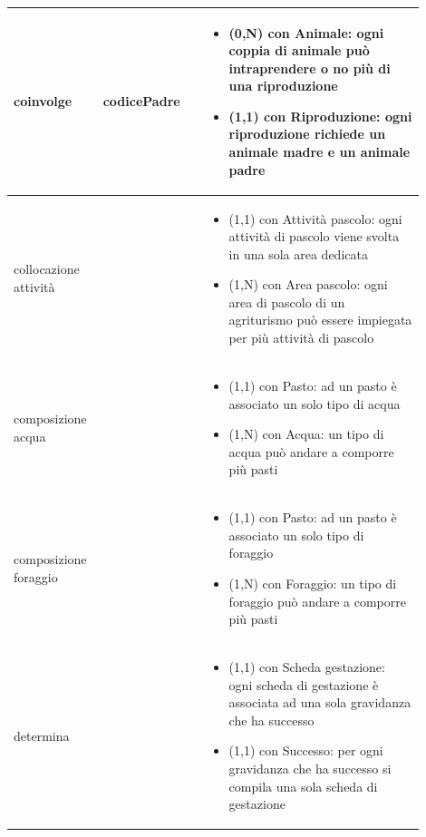 \documentclass[12pt,a4paper]{article}
\begin{document}
\begin{center}
\begin{longtable}{|p{0.16\linewidth}|p{0.24\linewidth}|p{0.50\linewidth}|}
\hline
coinvolge				&  codicePadre 
					& \begin{itemize}
						\setlength{\itemindent}{-1em}
						\vspace{-25pt}
						\setlength\itemsep{-0.25em}
						\item (0,N) con Animale: ogni coppia di animale può intraprendere o no più di una riproduzione
						\item (1,1) con Riproduzione: ogni riproduzione richiede un animale madre e un animale padre
					\end{itemize}\\ 

\hline
collocazione attività 				&   
					& \begin{itemize}
						\setlength{\itemindent}{-1em}
						\vspace{-25pt}
						\setlength\itemsep{-0.25em}
						\item (1,1) con Attività pascolo: ogni attività di pascolo viene svolta in una sola area dedicata
						\item (1,N) con Area pascolo: ogni area di pascolo di un agriturismo può essere impiegata per più attività di pascolo
					\end{itemize}\\ 

\hline
composizione acqua 				&   
					& \begin{itemize}
						\setlength{\itemindent}{-1em}
						\vspace{-25pt}
						\setlength\itemsep{-0.25em}
						\item (1,1) con Pasto: ad un pasto è associato un solo tipo di acqua
						\item (1,N) con Acqua: un tipo di acqua può andare a comporre più pasti
					\end{itemize}\\ 

\hline
composizione foraggio 				&   
					& \begin{itemize}
						\setlength{\itemindent}{-1em}
						\vspace{-25pt}
						\setlength\itemsep{-0.25em}
						\item (1,1) con Pasto: ad un pasto è associato un solo tipo di foraggio
						\item (1,N) con Foraggio: un tipo di foraggio può andare a comporre più pasti
					\end{itemize}\\ 

\hline
determina				&   
					& \begin{itemize}
						\setlength{\itemindent}{-1em}
						\vspace{-25pt}
						\setlength\itemsep{-0.25em}
						\item (1,1) con Scheda gestazione: ogni scheda di gestazione è associata ad una sola gravidanza che ha successo
						\item (1,1) con Successo: per ogni gravidanza che ha successo si compila una sola scheda di gestazione
					\end{itemize}\\ 


\end{longtable}
\end{center}
\end{document}
